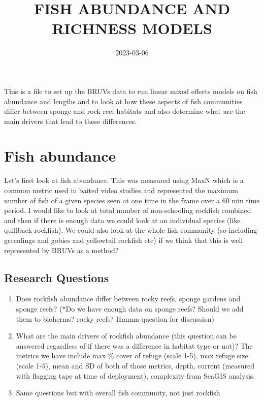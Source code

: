 \documentclass[
]{article}
\title{FISH ABUNDANCE AND RICHNESS MODELS}
\author{}
\date{\vspace{-2.5em}2023-03-06}
\begin{document}
\maketitle

This is a file to set up the BRUVs data to run linear mixed effects
models on fish abundance and lengths and to look at how these aspects of
fish communities differ between sponge and rock reef habitats and also
determine what are the main drivers that lead to these differences.

\hypertarget{fish-abundance}{%
\section{Fish abundance}\label{fish-abundance}}

Let's first look at fish abundance. This was measured using MaxN which
is a common metric used in baited video studies and represented the
maximum number of fish of a given species seen at one time in the frame
over a 60 min time period. I would like to look at total number of
non-schooling rockfish combined and then if there is enough data we
could look at an individual species (like quillback rockfish). We could
also look at the whole fish community (so including greenlings and
gobies and yellowtail rockfish etc) if we think that this is well
represented by BRUVs as a method?

\hypertarget{research-questions}{%
\subsection{Research Questions}\label{research-questions}}

\begin{enumerate}
\def\labelenumi{\arabic{enumi}.}
\item
  Does rockfish abundance differ between rocky reefs, sponge gardens and
  sponge reefs? (*Do we have enough data on sponge reefs? Should we add
  them to bioherms? rocky reefs? Hmmm question for discussion)
\item
  What are the main drivers of rockfish abundance (this question can be
  answered regardless of if there was a difference in habitat type or
  not)? The metrics we have include max \% cover of refuge (scale 1-5),
  max refuge size (scale 1-5), mean and SD of both of those metrics,
  depth, current (measured with flagging tape at time of deployment),
  complexity from SeaGIS analysis.
\item
  Same questions but with overall fish community, not just rockfish
\end{enumerate}
\end{document}
